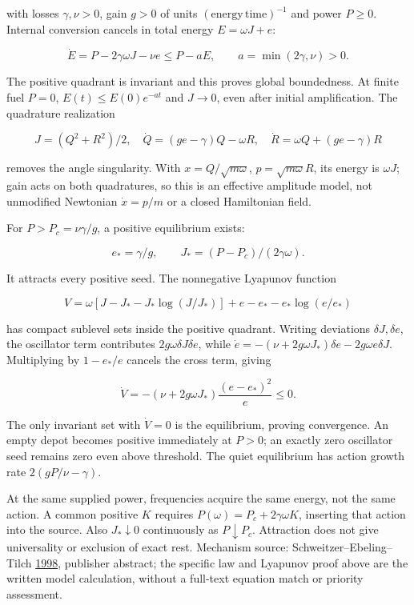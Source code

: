 \documentclass[11pt,a4paper]{article}
\begin{document}
with losses \(\gamma,\nu>0\), gain \(g>0\) of units
\((\mathrm{energy}\,\mathrm{time})^{-1}\) and power \(P\ge0\). Internal
conversion cancels in total energy \(E=\omega J+e\):

\[\dot E=P-2\gamma\omega J-\nu e\le P-aE,
\qquad a=\min(2\gamma,\nu)>0.\]

The positive quadrant is invariant and this proves global boundedness.
At finite fuel \(P=0\), \(E(t)\le E(0)e^{-at}\) and \(J\to0\), even
after initial amplification. The quadrature realization

\[J=(Q^2+R^2)/2,\quad
\dot Q=(ge-\gamma)Q-\omega R,\quad
\dot R=\omega Q+(ge-\gamma)R\]

removes the angle singularity. With \(x=Q/\sqrt{m\omega}\),
\(p=\sqrt{m\omega}R\), its energy is \(\omega J\); gain acts on both
quadratures, so this is an effective amplitude model, not unmodified
Newtonian \(\dot x=p/m\) or a closed Hamiltonian field.

For \(P>P_c=\nu\gamma/g\), a positive equilibrium exists:

\[e_* =\gamma/g,\qquad J_*=(P-P_c)/(2\gamma\omega).\]

It attracts every positive seed. The nonnegative Lyapunov function

\[V=\omega[J-J_*-J_*\log(J/J_*)]+e-e_*-e_*\log(e/e_*)\]

has compact sublevel sets inside the positive quadrant. Writing
deviations \(\delta J,\delta e\), the oscillator term contributes
\(2g\omega\delta J\delta e\), while
\(\dot e=-(\nu+2g\omega J_*)\delta e-2g\omega e\delta J\). Multiplying
by \(1-e_*/e\) cancels the cross term, giving

\[\dot V=-(\nu+2g\omega J_*)\frac{(e-e_*)^2}{e}\le0.\]

The only invariant set with \(\dot V=0\) is the equilibrium, proving
convergence. An empty depot becomes positive immediately at \(P>0\); an
exactly zero oscillator seed remains zero even above threshold. The
quiet equilibrium has action growth rate \(2(gP/\nu-\gamma)\).

At the same supplied power, frequencies acquire the same energy, not the
same action. A common positive \(K\) requires
\(P(\omega)=P_c+2\gamma\omega K\), inserting that action into the
source. Also \(J_*\downarrow0\) continuously as \(P\downarrow P_c\).
Attraction does not give universality or exclusion of exact rest.
Mechanism source: Schweitzer--Ebeling--Tilch
\href{https://doi.org/10.1103/PhysRevLett.80.5044}{1998}, publisher
abstract; the specific law and Lyapunov proof above are the written
model calculation, without a full-text equation match or priority
assessment.
\end{document}
